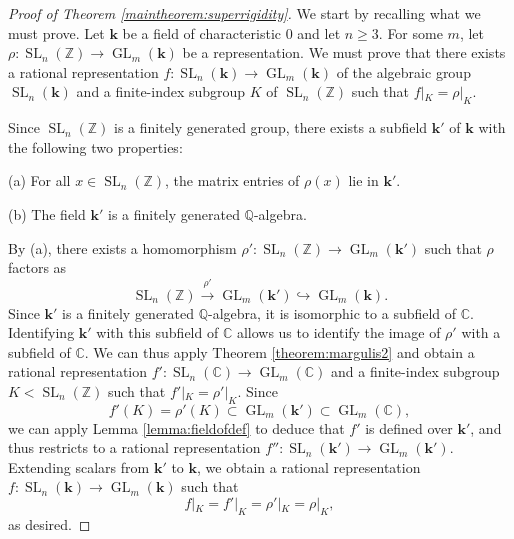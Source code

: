 \documentclass[11pt]{article}
\numberwithin{equation}{section}
\theoremstyle{plain}
\theoremstyle{definition}
\theoremstyle{remark}
\DeclareMathOperator{\GL}{GL}
\DeclareMathOperator{\SL}{SL}
\newcommand\C{\ensuremath{\mathbb{C}}}
\newcommand\Z{\ensuremath{\mathbb{Z}}}
\newcommand\Q{\ensuremath{\mathbb{Q}}}
\newcommand\bk{\ensuremath{\mathbf{k}}}
\begin{document}
\begin{proof}[Proof of Theorem \ref{maintheorem:superrigidity}]
We start by recalling what we must prove.
Let $\bk$ be a field of characteristic $0$ and let $n \geq 3$.
For some $m$, let $\rho\colon \SL_n(\Z) \rightarrow \GL_m(\bk)$
be a representation.  We must prove that there exists a rational representation 
$f\colon \SL_n(\bk) \rightarrow \GL_m(\bk)$ of
the algebraic group $\SL_n(\bk)$ and a finite-index subgroup $K$ of $\SL_n(\Z)$ such that $f|_K = \rho|_K$.

Since $\SL_n(\Z)$ is a finitely generated group, there exists a subfield $\bk'$ of $\bk$ with
the following two properties:
\begin{compactitem}
\item[(a)] For all $x \in \SL_n(\Z)$, the matrix entries of $\rho(x)$ lie in $\bk'$.
\item[(b)] The field $\bk'$ is a finitely generated $\Q$-algebra.
\end{compactitem}
By (a), there exists a homomorphism $\rho'\colon \SL_n(\Z) \rightarrow \GL_m(\bk')$ such
that $\rho$ factors as
\[\SL_n(\Z) \stackrel{\rho'}{\longrightarrow} \GL_m(\bk') \hookrightarrow \GL_m(\bk).\]
Since $\bk'$ is a finitely generated $\Q$-algebra, it is isomorphic to a subfield of
$\C$.  Identifying $\bk'$ with this subfield of $\C$ allows us to identify the image
of $\rho'$ with a subfield of $\C$.  We can thus apply Theorem \ref{theorem:margulis2}
and obtain a rational representation $f'\colon \SL_n(\C) \rightarrow \GL_m(\C)$ and
a finite-index subgroup $K<\SL_n(\Z)$ such that $f'|_{K} = \rho'|_{K}$.  Since
\[f'(K) = \rho'(K) \subset \GL_m(\bk') \subset \GL_m(\C),\]
we can apply Lemma \ref{lemma:fieldofdef} to deduce that $f'$ is defined over
$\bk'$, and thus restricts to a rational representation 
$f''\colon \SL_n(\bk') \rightarrow \GL_m(\bk')$.  Extending scalars from $\bk'$
to $\bk$, we obtain a rational representation $f\colon \SL_n(\bk) \rightarrow \GL_m(\bk)$
such that 
\[f|_K = f'|_K = \rho'|_K = \rho|_K,\]
as desired.
\end{proof}
\end{document}
